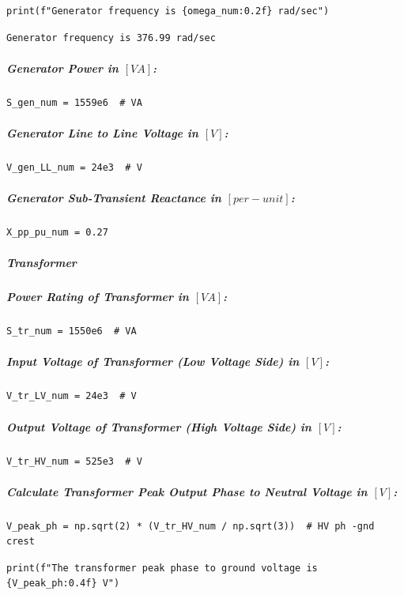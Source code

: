\begin{verbatim}
print(f"Generator frequency is {omega_num:0.2f} rad/sec")
\end{verbatim}

\begin{verbatim}
Generator frequency is 376.99 rad/sec
\end{verbatim}

\subparagraph{Generator Power in $\left[VA\right]$:}

\begin{verbatim}
S_gen_num = 1559e6  # VA
\end{verbatim}

\subparagraph{Generator Line to Line Voltage in $\left[V\right]$:}

\begin{verbatim}
V_gen_LL_num = 24e3  # V
\end{verbatim}

\subparagraph{Generator Sub-Transient Reactance in $\left[per -unit\right]$:}

\begin{verbatim}
X_pp_pu_num = 0.27
\end{verbatim}

\subparagraph{Transformer}

\subparagraph{Power Rating of Transformer in $\left[VA\right]$:}

\begin{verbatim}
S_tr_num = 1550e6  # VA
\end{verbatim}

\subparagraph{Input Voltage of Transformer (Low Voltage Side) in $\left[V\right]$:}

\begin{verbatim}
V_tr_LV_num = 24e3  # V
\end{verbatim}

\subparagraph{Output Voltage of Transformer (High Voltage Side) in $\left[V\right]$:}

\begin{verbatim}
V_tr_HV_num = 525e3  # V
\end{verbatim}

\subparagraph{Calculate Transformer Peak Output Phase to Neutral Voltage in $\left[V\right]$:}

\begin{verbatim}
V_peak_ph = np.sqrt(2) * (V_tr_HV_num / np.sqrt(3))  # HV ph -gnd crest
\end{verbatim}

\begin{verbatim}
print(f"The transformer peak phase to ground voltage is {V_peak_ph:0.4f} V")
\end{verbatim}

